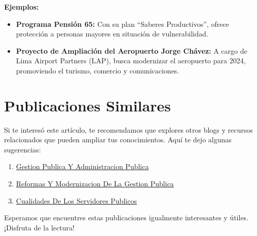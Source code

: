 \documentclass[
  jou,
  floatsintext,
  longtable,
  a4paper,
  nolmodern,
  notxfonts,
  notimes,
  12pt,
  colorlinks=true,linkcolor=blue,citecolor=blue,urlcolor=blue]{apa7}
\providecommand{\tightlist}{%
  \setlength{\itemsep}{0pt}\setlength{\parskip}{0pt}}
\begin{document}
\textbf{Ejemplos:}

\begin{itemize}
\tightlist
\item
  \textbf{Programa Pensión 65:} Con su plan ``Saberes Productivos'',
  ofrece protección a personas mayores en situación de vulnerabilidad.
\item
  \textbf{Proyecto de Ampliación del Aeropuerto Jorge Chávez:} A cargo
  de Lima Airport Partners (LAP), busca modernizar el aeropuerto para
  2024, promoviendo el turismo, comercio y comunicaciones.
\end{itemize}

\section{Publicaciones Similares}\label{publicaciones-similares}

Si te interesó este artículo, te recomendamos que explores otros blogs y
recursos relacionados que pueden ampliar tus conocimientos. Aquí te dejo
algunas sugerencias:

\begin{enumerate}
\def\labelenumi{\arabic{enumi}.}
\tightlist
\item
  \href{https://res-publica.netlify.app/posts/2021-10-01-gestion-publica-y-administracion-publica/index.pdf}{}
  \href{https://res-publica.netlify.app/posts/2021-10-01-gestion-publica-y-administracion-publica}{Gestion
  Publica Y Administracion Publica}
\item
  \href{https://res-publica.netlify.app/posts/2021-10-01-reformas-y-modernizacion-de-la-gestion-publica/index.pdf}{}
  \href{https://res-publica.netlify.app/posts/2021-10-01-reformas-y-modernizacion-de-la-gestion-publica}{Reformas
  Y Modernizacion De La Gestion Publica}
\item
  \href{https://res-publica.netlify.app/posts/2023-05-11-cualidades-de-los-servidores-publicos/index.pdf}{}
  \href{https://res-publica.netlify.app/posts/2023-05-11-cualidades-de-los-servidores-publicos}{Cualidades
  De Los Servidores Publicos}
\end{enumerate}

Esperamos que encuentres estas publicaciones igualmente interesantes y
útiles. ¡Disfruta de la lectura!
\end{document}
